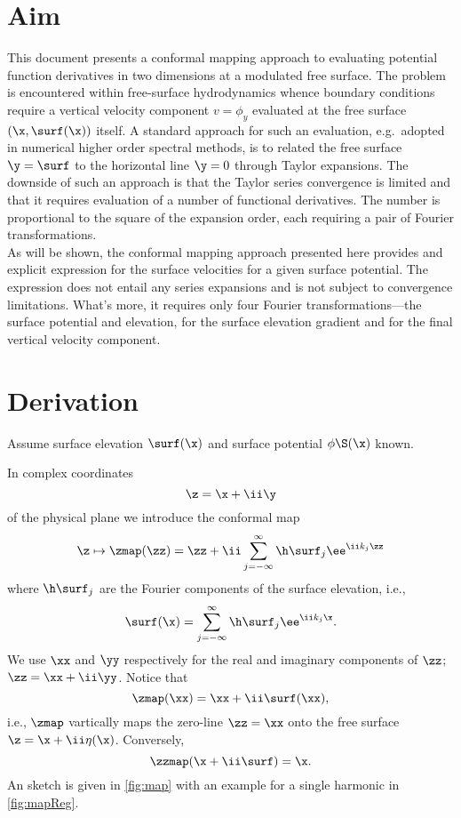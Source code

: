 

\section{Aim}
This document presents a conformal mapping approach to evaluating potential function derivatives in two dimensions at a modulated free surface.
The problem is encountered within free-surface hydrodynamics whence boundary conditions require a vertical velocity component $v=\phi_y$ evaluated at the free surface $(\x,\surf(\x))$ itself.
A standard approach for such an evaluation, e.g.\ adopted in numerical higher order spectral methods, is to related the free surface $\y=\surf$ to the horizontal line $\y=0$ through Taylor expansions.
The downside of such an approach is that the Taylor series convergence is limited \citep{west1981deep} and that it requires evaluation of a number of functional derivatives.
The number is proportional to the square of the expansion order, each requiring a pair of Fourier transformations.
\\

As will be shown, the conformal mapping approach presented here provides and explicit expression for the surface velocities for a given surface potential.
The expression does not entail any series expansions and is not subject to convergence limitations.
What's more, it requires only four Fourier transformations---the surface potential and elevation, for the surface elevation gradient and for the final vertical velocity component.

\section{Derivation}
Assume surface elevation $\surf(\x)$ and surface potential $\phi\S(\x)$ known.

In complex coordinates
\[  \z = \x+\ii\y \]
of the physical plane
we introduce the conformal map
\begin{equation}
\z\mapsto\zmap(\zz) = \zz + \ii \sum_{j=-\infty}^\infty\h\surf_j \ee^{\ii k_j \zz}
\label{eq:map}
\end{equation}
where $\h\surf_j$ are the Fourier components of the surface elevation, i.e.,\
\[
\surf(\x) = \sum_{j=-\infty}^\infty\h\surf_j \ee^{\ii k_j \x}.
\]
We use $\xx$ and $\yy$ respectively for the real and imaginary components of $\zz$; $\zz = \xx+\ii\yy$.
Notice that 
\begin{equation}
\zmap(\xx) = \xx+\ii \surf(\xx),
\label{eq:mapXi}
\end{equation}
i.e., $\zmap$ vartically  maps the zero-line $\zz=\xx$ onto the free surface $\z=\x+\ii\eta(\x)$.
Conversely,
\begin{equation}
\zzmap(\x+\ii\surf) = \x.
\label{eq:invMap}
\end{equation}
An sketch is given in \autoref{fig:map} with an example for a single harmonic in \autoref{fig:mapReg}.


